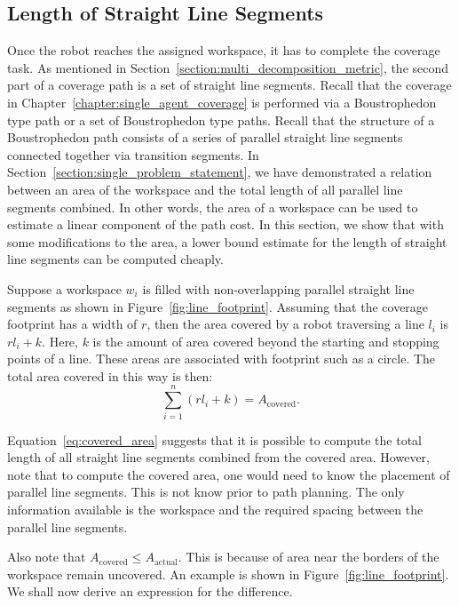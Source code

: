 \documentclass[../main.tex]{subfiles}
\begin{document}
\subsection{Length of Straight Line Segments}
\label{subsection:sum_straight_segments}

Once the robot reaches the assigned workspace, it has to complete the coverage task. As mentioned in Section~\ref{section:multi_decomposition_metric}, the second part of a coverage path is a set of straight line segments. Recall that the coverage in Chapter~\ref{chapter:single_agent_coverage} is performed via a Boustrophedon type path or a set of Boustrophedon type paths. Recall that the structure of a Boustrophedon path consists of a series of parallel straight line segments connected together via transition segments. In Section~\ref{section:single_problem_statement}, we have demonstrated a relation between an area of the workspace and the total length of all parallel line segments combined. In other words, the area of a workspace can be used to estimate a linear component of the path cost. In this section, we show that with some modifications to the area, a lower bound estimate for the length of straight line segments can be computed cheaply.

Suppose a workspace $w_i$ is filled with non-overlapping parallel straight line segments as shown in Figure~\ref{fig:line_footprint}. Assuming that the coverage footprint has a width of $r$, then the area covered by a robot traversing a line $l_i$ is $rl_i+k$. Here, $k$ is the amount of area covered beyond the starting and stopping points of a line. These areas are associated with footprint such as a circle. The total area covered in this way is then:
\begin{equation}
	\label{eq:covered_area}
	\sum_{i=1}^n(rl_i+k)=A_{\text{covered}}.%
\end{equation}


Equation~\ref{eq:covered_area} suggests that it is possible to compute the total length of all straight line segments combined from the covered area. However, note that to compute the covered area, one would need to know the placement of parallel line segments. This is not know prior to path planning. The only information available is the workspace and the required spacing between the parallel line segments.

Also note that $A_{\text{covered}}\leq A_{\text{actual}}$. This is because of area near the borders of the workspace remain uncovered. An example is shown in Figure~\ref{fig:line_footprint}. We shall now derive an expression for the difference.
\end{document}
